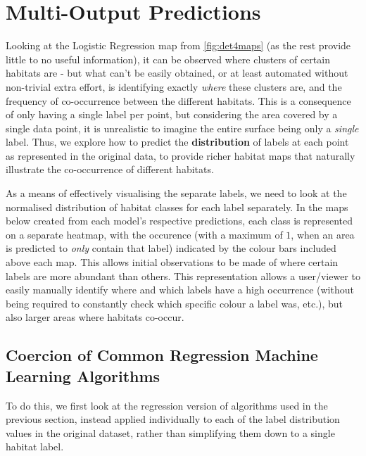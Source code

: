 


\section{Multi-Output Predictions} 
Looking at the Logistic Regression map from \autoref{fig:det4maps} (as the rest provide little to no useful information), it can be observed where clusters of certain habitats are - but what can't be easily obtained, or at least automated without non-trivial extra effort, is identifying exactly \textit{where} these clusters are, and the frequency of co-occurrence between the different habitats. This is a consequence of only having a single label per point, but considering the area covered by a single data point, it is unrealistic to imagine the entire surface being only a \textit{single} label. Thus, we explore how to predict the \textbf{distribution} of labels at each point as represented in the original data, to provide richer habitat maps that naturally illustrate the co-occurrence of different habitats.

As a means of effectively visualising the separate labels, we need to look at the normalised distribution of habitat classes for each label separately. In the maps below created from each model's respective predictions, each class is represented on a separate heatmap, with the occurence (with a maximum of $1$, when an area is predicted to \textit{only} contain that label) indicated by the colour bars included above each map. This allows initial observations to be made of where certain labels are more abundant than others. This representation allows a user/viewer to easily manually identify where and which labels have a high occurrence (without being required to constantly check which specific colour a label was, etc.), but also larger areas where habitats co-occur.

\subsection{Coercion of Common Regression Machine Learning Algorithms} \label{ss:commonMLcoercion}
To do this, we first look at the regression version of algorithms used in the previous section, instead applied individually to each of the label distribution values in the original dataset, rather than simplifying them down to a single habitat label. 


